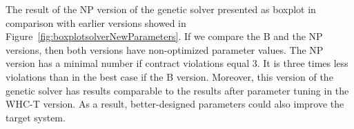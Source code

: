 \begin{table}
	\centering
	\caption{Parameters of NP and NP-T versions of the genetic solver}\label{tab:Parameters_NP-T}
\end{table}

The result of the NP version of the genetic solver presented as boxplot in comparison with earlier versions showed in Figure~\ref{fig:boxplotsolverNewParameters}. If we compare the B and the NP versions, then both versions have non-optimized parameter values. The NP version has a minimal number if contract violations equal 3. It is three times less violations than in the best case if the B version. Moreover, this version of the genetic solver has results comparable to the results after parameter tuning in the WHC-T version. As a result, better-designed parameters could also improve the target system. 

